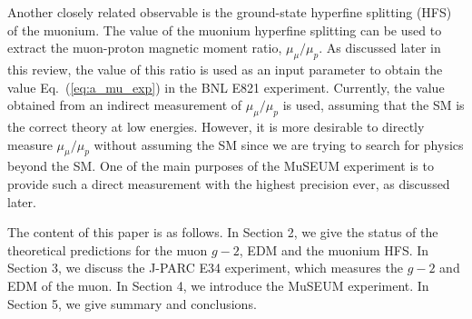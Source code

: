 Another closely related observable is the ground-state hyperfine
splitting (HFS) of the muonium.  The value of the muonium hyperfine
splitting can be used to extract the muon-proton magnetic
moment ratio, $\mu_\mu/\mu_p$.  As discussed later in this review,
the value of this ratio is used as an input parameter to obtain
the value Eq.~(\ref{eq:a_mu_exp}) in the BNL E821 experiment.  
Currently, the value obtained from an indirect measurement of 
$\mu_\mu/\mu_p$ is used, assuming that the SM is the correct
theory at low energies.  However, it is more desirable to directly
measure $\mu_\mu/\mu_p$ without assuming the SM since we are 
trying to search for physics beyond the SM.  One of the main
purposes of the MuSEUM experiment is to provide such a direct
measurement with the highest precision ever, as discussed later.  

The content of this paper is as follows.  In Section 2, we
give the status of the theoretical predictions for the muon $g-2$,
EDM and the muonium HFS.  In Section 3, we discuss the J-PARC
E34 experiment, which measures the $g-2$ and EDM of the muon.
In Section 4, we introduce the MuSEUM experiment.  In Section 5,
we give summary and conclusions.





